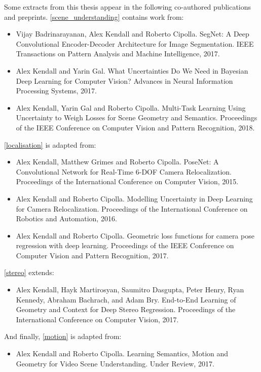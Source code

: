 Some extracts from this thesis appear in the following co-authored publications and preprints.
\cref{scene_understanding} contains work from:
\begin{itemize}
\item Vijay Badrinarayanan, Alex Kendall and Roberto Cipolla. SegNet: A Deep Convolutional Encoder-Decoder Architecture for Image Segmentation. IEEE Transactions on Pattern Analysis and Machine Intelligence, 2017.
\item Alex Kendall and Yarin Gal. What Uncertainties Do We Need in Bayesian Deep Learning for Computer Vision? Advances in Neural Information Processing Systems, 2017.
\item Alex Kendall, Yarin Gal and Roberto Cipolla. Multi-Task Learning Using Uncertainty to Weigh Losses for Scene Geometry and Semantics. Proceedings of the IEEE Conference on Computer Vision and Pattern Recognition, 2018.
\end{itemize}
\cref{localisation} is adapted from:
\begin{itemize}
\item Alex Kendall, Matthew Grimes and Roberto Cipolla. PoseNet: A Convolutional Network for Real-Time 6-DOF Camera Relocalization. Proceedings of the International Conference on Computer Vision, 2015.
\item Alex Kendall and Roberto Cipolla. Modelling Uncertainty in Deep Learning for Camera Relocalization. Proceedings of the International Conference on Robotics and Automation, 2016.
\item Alex Kendall and Roberto Cipolla. Geometric loss functions for camera pose regression with deep learning. Proceedings of the IEEE Conference on Computer Vision and Pattern Recognition, 2017.
\end{itemize}
\cref{stereo} extends:
\begin{itemize}
\item Alex Kendall, Hayk Martirosyan, Saumitro Dasgupta, Peter Henry, Ryan Kennedy, Abraham Bachrach, and Adam Bry. End-to-End Learning of Geometry and Context for Deep Stereo Regression. Proceedings of the International Conference on Computer Vision, 2017.
\end{itemize}
And finally, \cref{motion} is adapted from:
\begin{itemize}
\item Alex Kendall and Roberto Cipolla. Learning Semantics, Motion and Geometry for Video Scene Understanding. Under Review, 2017.
\end{itemize}

